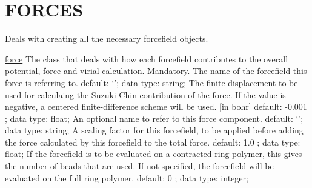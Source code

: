 \section{FORCES}
\label{FORCES}
\begin{ipifield}{}%
{Deals with creating all the necessary forcefield objects.}%
{}%
{}
\begin{ipifield}{\hyperref[FORCECOMPONENT]{force}}%
{The class that deals with how each forcefield contributes to the overall potential, force and virial calculation.}%
{}%
{%
{Mandatory. The name of the forcefield this force is referring to.}%
{default: `'; data type: string; }%
%
{The finite displacement to be used for calculaing the Suzuki-Chin contribution of the force. If the value is negative, a centered finite-difference scheme will be used. [in bohr]}%
{default:  -0.001 ; data type: float; }%
%
{An optional name to refer to this force component.}%
{default: `'; data type: string; }%
%
{A scaling factor for this forcefield, to be applied before adding the force calculated by this forcefield to the total force.}%
{default:  1.0 ; data type: float; }%
%
{If the forcefield is to be evaluated on a contracted ring polymer, this gives the number of beads that are used. If not specified, the forcefield will be evaluated on the full ring polymer.}%
{default:  0 ; data type: integer; }%
}
\end{ipifield}
\end{ipifield}

